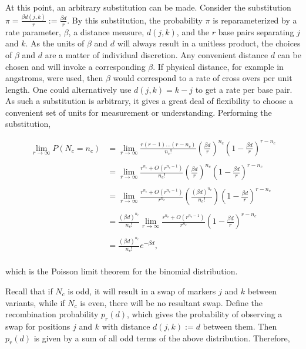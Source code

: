 \documentclass{article}
\begin{document}
\noindent At this point, an arbitrary substitution can be made. Consider the substitution $\pi = \frac{\beta d(j,k)}{r} := \frac{\beta d}{r}$. By this substitution, the probability $\pi$ is reparameterized by a rate parameter, $\beta$, a distance measure, $d(j,k)$, and the $r$ base pairs separating $j$ and $k$. As the units of $\beta$ and $d$ will always result in a unitless product, the choices of $\beta$ and $d$ are a matter of individual discretion. Any convenient distance $d$ can be chosen and will invoke a corresponding $\beta$. If physical distance, for example in angstroms, were used, then $\beta$ would correspond to a rate of cross overs per unit length. One could alternatively use $d(j,k)=k-j$ to get a rate per base pair. As such a substitution is arbitrary, it gives a great deal of flexibility to choose a convenient set of units for measurement or understanding. Performing the substitution,

\begin{equation} \label{eq:poissonlim}
  \begin{split}
    \lim_{r \rightarrow \infty} P(N_c = n_c) & = \lim_{r \rightarrow \infty} \frac{r(r-1)\dots (r-n_c)}{n_c!} \left ( \frac{\beta d}{r} \right )^{n_c} \left ( 1-\frac{\beta d}{r} \right )^{r - n_c} \\
    & \\
    & = \lim_{r \rightarrow \infty} \frac{r^{n_c} + O(r^{n_c-1})}{n_c!} \left ( \frac{\beta d}{r} \right )^{n_c} \left ( 1-\frac{\beta d}{r} \right )^{r - n_c} \\
    & \\
    & = \lim_{r \rightarrow \infty} \frac{r^{n_c} + O(r^{n_c-1})}{r^{n_c}} \left ( \frac{(\beta d)^{n_c}}{n_c!} \right ) \left ( 1-\frac{\beta d}{r} \right )^{r - n_c} \\
    & \\
    & = \frac{(\beta d)^{n_c}}{n_c!} \lim_{r \rightarrow \infty} \frac{r^{n_c} + O(r^{n_c-1})}{r^{n_c}} \left ( 1-\frac{\beta d}{r} \right )^{r - n_c} \\
    & \\
    & = \frac{(\beta d)^{n_c}}{n_c!} e^{-\beta d}, \\
  \end{split}
\end{equation}

\noindent which is the Poisson limit theorem for the binomial distribution.

Recall that if $N_c$ is odd, it will result in a swap of markers $j$ and $k$ between variants, while if $N_c$ is even, there will be no resultant swap. Define the recombination probability $p_r(d)$, which gives the probability of observing a swap for positions $j$ and $k$ with distance $d(j,k) := d$ between them. Then $p_r(d)$ is given by a sum of all odd terms of the above distribution. Therefore,
\end{document}
